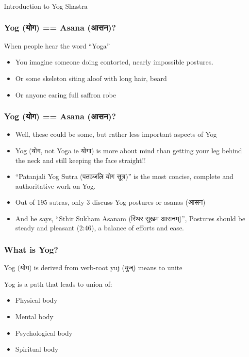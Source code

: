 \begin{frame}[fragile]\frametitle{}
\begin{center}
{\Large Introduction to Yog Shastra}
\end{center}
\end{frame}

\begin{frame}[fragile]\frametitle{Yog (योग) == Asana (आसन)?}
When people hear the word ``Yoga''

	\begin{itemize}
	\item You imagine someone doing contorted, nearly impossible postures.
	\item Or some skeleton siting aloof with long hair, beard
	\item Or anyone earing full saffron robe
	\end{itemize}

\end{frame}

\begin{frame}[fragile]\frametitle{Yog (योग) == Asana (आसन)?}

	\begin{itemize}
	\item Well, these could be some, but rather less important aspects of Yog
	\item Yog (योग, not Yoga ie योगा) is more about mind than getting your leg behind the neck and still keeping the face straight!!
	\item ``Patanjali Yog Sutra (पतञ्जलि योग सूत्र)'' is the most concise, complete and authoritative work on Yog.
	\item Out of 195 sutras, only 3 discuss Yog postures or asanas (आसन)
	\item And he says, ``Sthir Sukham Asanam (स्थिर सुखम आसनम्)'', Postures should be steady and pleasant (2:46), a balance of efforts and ease.
	\end{itemize}

\end{frame}


\begin{frame}[fragile]\frametitle{What is Yog?}

Yog (योग) is derived from verb-root yuj (युज्) means to unite

Yog is a path that leads to union of:
	\begin{itemize}
	\item Physical body
	\item Mental body
	\item Psychological body
	\item Spiritual body
	\end{itemize}

\end{frame}

